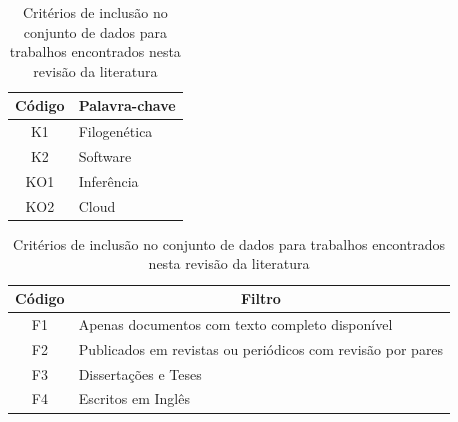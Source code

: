 \documentclass[english,brazilian]{UNISINOSmonografia} %
\newcommand\defaultFigureWidth{0.9}
\begin{document}
\begin{table}[tb]
\centering%
\begin{minipage}{\defaultFigureWidth\textwidth}
	\begin{minipage}{.4\textwidth}
		\caption{Palavras-chaves utilizadas na composição dos termos de busca desta revisão da literatura}
		\label{tab:survey-keywords}
		\vspace{1ex}
		\begin{tabularx}{\textwidth}{cX}
			\toprule
			Código & \multicolumn{1}{c}{Palavra-chave} \\ 
			\midrule
			K1 & Filogenética \\
			K2 & Software \\
			KO1 & Inferência \\
			KO2 & Cloud \\
			\bottomrule
		\end{tabularx}
	\end{minipage}
	\hfill
	\begin{minipage}{.55\textwidth}
		\caption{Critérios de inclusão no conjunto de dados para trabalhos encontrados nesta revisão da literatura}
		\label{tab:survey-filters}
		\vspace{1ex}
		\renewcommand {\tabularxcolumn}[1]{>{\arraybackslash}m{#1}}
		\begin{tabularx}{\textwidth}{cX}
			\toprule
			Código & \multicolumn{1}{c}{Filtro} \\ 
			\midrule
			F1 & Apenas documentos com texto completo disponível \\
			F2 & Publicados em revistas ou periódicos com revisão por pares \\
			F3 & Dissertações e Teses \\
			F4 & Escritos em Inglês \\
			\bottomrule
		\end{tabularx}
	\end{minipage}
\end{minipage}
\end{table}
\end{document}
